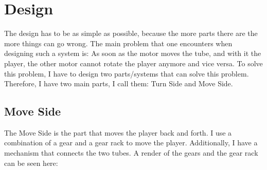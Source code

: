 \section{Design}\label{sec:design}
The design has to be as simple as possible, because the more parts there are the more things can go wrong.
The main problem that one encounters when designing such a system is:
As soon as the motor moves the tube, and with it the player, the other motor cannot rotate the player anymore and vice versa.
To solve this problem, I have to design two parts/systems that can solve this problem.
Therefore, I have two main parts, I call them: Turn Side and Move Side.

\subsection{Move Side}\label{subsec:move-side}
The Move Side is the part that moves the player back and forth.
I use a combination of a gear and a gear rack to move the player.
Additionally, I have a mechanism that connects the two tubes.
A render of the gears and the gear rack can be seen here:\\

